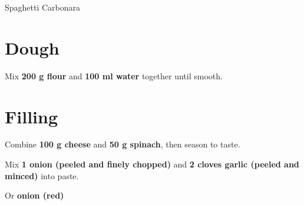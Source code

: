 \begin{recipe}{Spaghetti Carbonara}{}
\vspace{1em}


\section{Dough}
Mix \textbf{200 g flour} and \textbf{100 ml water} together until smooth.

\vspace{1em}


\section{Filling}
Combine \textbf{100 g cheese} and \textbf{50 g spinach}, then season to taste.

\vspace{1em}


Mix \textbf{1 onion (peeled and finely chopped)} and \textbf{2 cloves garlic (peeled and minced)} into paste.

\vspace{1em}


Or \textbf{onion (red)}

\vspace{1em}


\end{recipe}
\cleardoublepage
